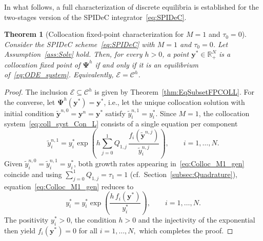 \documentclass[a4paper,num-refs]{oup-contemporary-spidec}
\newtheorem{theorem}{Theorem}[section]
\begin{document}
In what follows, a full characterization of discrete equilibria is established for the two-stages version of the SPIDeC integrator~\eqref{eq:SPIDeC}.
\begin{theorem}[Collocation fixed-point characterization for $M=1$ and $\tau_0=0$]
\label{thm:FP_Collocation_M1}
    Consider the SPIDeC scheme~\eqref{eq:SPIDeC} with $M=1$ and $\tau_0=0$. Let Assumption~\ref{ass:Solv} hold. Then, for every $h>0$, a point $\bm{y}^*\in\mathbb{R}_{+}^{N}$ is a collocation fixed point of $\bm{\Psi}^h$ if and only if it is an equilibrium of~\eqref{eq:ODE_system}. Equivalently, $\mathcal{E}=\mathcal{C}^{h}$.
\end{theorem}
\begin{proof}
    The inclusion $\mathcal{E}\subseteq\mathcal{C}^{h}$ is given by
    Theorem~\ref{thm:EqSubsetFPCOLL}. For the converse, let
    $\bm{\Psi}^h(\bm{y}^*)=\bm{y}^*$, i.e., let the unique collocation solution
    with initial condition $\tilde{\bm{y}}^{n,0}=\bm{y}^n=\bm{y}^*$ satisfy
    $\tilde{y}_i^{n,1}=y_i^*$. Since $M=1$, the collocation system~\eqref{eq:coll_syst_Con_L} consists of a
    single equation per component 
    \begin{equation}\label{eq:Colloc_M1_gen}
        \tilde{y}_i^{n,1}
        = y_i^*\exp\!\left(h\sum_{j=0}^{1} Q_{1,j}\,
          \frac{f_i\!\left(\tilde{\bm{y}}^{n,j}\right)}
               {\tilde{y}_i^{n,j}}\right), \qquad i=1,\dots,N.
    \end{equation}
    Given $\tilde{y}_i^{n,0}=\tilde{y}_i^{n,1}=y_i^*$, both growth rates
    appearing in~\eqref{eq:Colloc_M1_gen} coincide and using $\sum_{j=0}^1 Q_{1,j}=\tau_1=1$
    (cf.\ Section~\ref{subsec:Quadrature}), equation~\eqref{eq:Colloc_M1_gen}
    reduces to
    \begin{equation*}
        y_i^* = y_i^*\exp\!\left(\frac{h\,f_i(\bm{y}^*)}{y_i^*}\right), \qquad i=1,\dots,N.
    \end{equation*}
    The positivity $y_i^*>0$, the condition $h>0$ and the injectivity of the exponential then yield $f_i(\bm{y}^*)=0$ for all $i=1,\dots,N,$ which completes the proof.
\end{proof}
\end{document}
